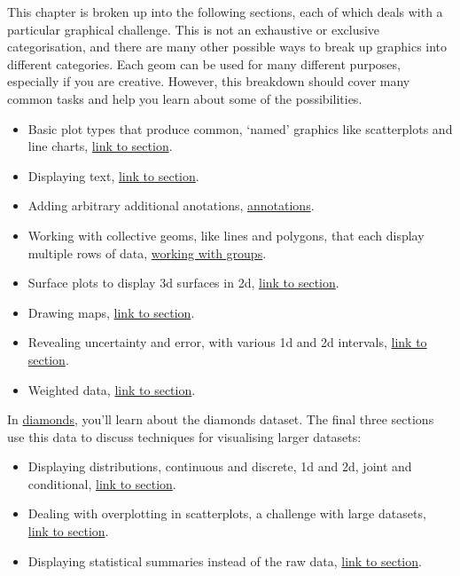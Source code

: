 This chapter is broken up into the following sections, each of which
deals with a particular graphical challenge. This is not an exhaustive
or exclusive categorisation, and there are many other possible ways to
break up graphics into different categories. Each geom can be used for
many different purposes, especially if you are creative. However, this
breakdown should cover many common tasks and help you learn about some
of the possibilities.

\begin{itemize}
\item
  Basic plot types that produce common, `named' graphics like
  scatterplots and line charts, \protect\hyperlink{sec:basics}{link to
  section}.
\item
  Displaying text, \protect\hyperlink{sec:labelling}{link to section}.
\item
  Adding arbitrary additional anotations,
  \protect\hyperlink{sec:annotations}{annotations}.
\item
  Working with collective geoms, like lines and polygons, that each
  display multiple rows of data,
  \protect\hyperlink{sec:grouping}{working with groups}.
\item
  Surface plots to display 3d surfaces in 2d,
  \protect\hyperlink{sec:surface}{link to section}.
\item
  Drawing maps, \protect\hyperlink{sec:maps}{link to section}.
\item
  Revealing uncertainty and error, with various 1d and 2d intervals,
  \protect\hyperlink{sec:uncertainty}{link to section}.
\item
  Weighted data, \protect\hyperlink{sec:weighting}{link to section}.
\end{itemize}

In \protect\hyperlink{sec:diamonds}{diamonds}, you'll learn about the
diamonds dataset. The final three sections use this data to discuss
techniques for visualising larger datasets:

\begin{itemize}
\item
  Displaying distributions, continuous and discrete, 1d and 2d, joint
  and conditional, \protect\hyperlink{sec:distributions}{link to
  section}.
\item
  Dealing with overplotting in scatterplots, a challenge with large
  datasets,\\
   \protect\hyperlink{sec:overplotting}{link to section}.
\item
  Displaying statistical summaries instead of the raw data,
  \protect\hyperlink{sec:summary}{link to section}.
\end{itemize}

